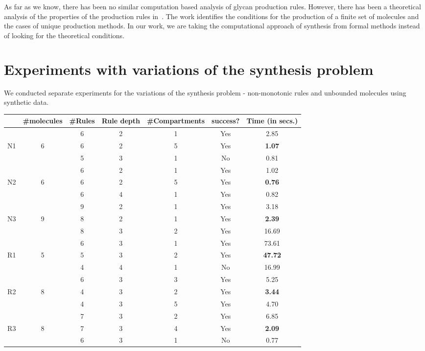 \documentclass{llncs}
\begin{document}
As far as we know, there has been no similar computation based analysis of glycan production rules.
%
However, there has been a theoretical analysis of the properties of the production
rules in~\cite{Jaiman2018}. The work identifies the conditions for the production
of a finite set of molecules and the cases of unique production methods.
%
In our work, we are taking the computational approach of synthesis from formal methods
instead of looking for the theoretical conditions.
\section{Experiments with variations of the synthesis problem}
\label{sec:appendix}
We conducted separate experiments for the variations of the synthesis problem - non-monotonic rules and unbounded molecules using synthetic data.
%
\begin{table}
  \centering
  \begin{tabular}{|c|c|c|c|c|c|c|}\hline
     & \#molecules& \#Rules & Rule depth & \#Compartments & success? & Time (in secs.) 
          \\\hline
         &   & 6  & 2 & 1 & Yes &  2.85 \\\cline{3-7}
    N1   & 6 & 6  & 2 & 5 & Yes & {\bf 1.07}  \\\cline{3-7}
         &   & 5  & 3 & 1 & No & 0.81  \\\hline
         
         &   & 6  & 2 & 1 & Yes & 1.02  \\\cline{3-7}
    N2   & 6 & 6  & 2 & 5 & Yes & {\bf 0.76}  \\\cline{3-7}
         &   & 6  & 4 & 1 & Yes & 0.82 \\\hline
         
         &   & 9  & 2  & 1  & Yes & 3.18  \\\cline{3-7}
    N3   & 9 & 8  & 2 & 1 & Yes & {\bf 2.39}  \\\cline{3-7}
         &   & 8  & 3 & 2 & Yes  &  16.69 \\\hline
         
         &   & 6  & 3  & 1  & Yes & 73.61  \\\cline{3-7}
    R1   & 5 & 5  & 3 & 2 & Yes & {\bf 47.72}  \\\cline{3-7}
         &   & 4  & 4 & 1 & No  &  16.99 \\\hline
         
         &   & 6  & 3 & 3 & Yes &  5.25 \\\cline{3-7}
    R2   & 8 & 4  & 3 & 2 & Yes & {\bf 3.44}  \\\cline{3-7}
         &   & 4  & 3 & 5 & Yes  &  4.70 \\\hline
         
         &   & 7  & 3 & 2 & Yes &  6.85 \\\cline{3-7}
    R3   & 8 & 7  & 3 & 4 & Yes & {\bf 2.09}  \\\cline{3-7}
         &   & 6  & 3 & 1 & No  & 0.77  \\\hline
  \end{tabular}   
  \end{table}
\end{document}
